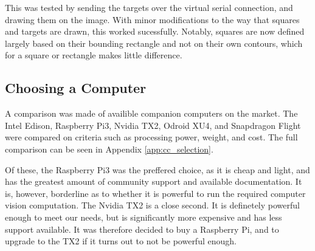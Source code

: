 \documentclass[11pt]{article}
\begin{document}
This was tested by sending the targets over the virtual serial connection, and drawing them on the image. With minor modifications to the way that squares and targets are drawn, this worked sucessfully. Notably, squares are now defined largely based on their bounding rectangle and not on their own contours, which for a square or rectangle makes little difference.

\subsection{Choosing a Computer}
A comparison was made of availible companion computers on the market. The Intel Edison, Raspberry Pi3, Nvidia TX2, Odroid XU4, and Snapdragon Flight were compared on criteria such as processing power, weight, and cost. The full comparison can be seen in Appendix \ref{app:cc_selection}.

Of these, the Raspberry Pi3 was the preffered choice, as it is cheap and light, and has the greatest amount of community support and available documentation. It is, however, borderline as to whether it is powerful to run the required computer vision computation. The Nvidia TX2 is a close second. It is definetely powerful enough to meet our needs, but is significantly more expensive and has less support available. It was therefore decided to buy a Raspberry Pi, and to upgrade to the TX2 if it turns out to not be powerful enough.




\newpage
\appendix
\end{document}
